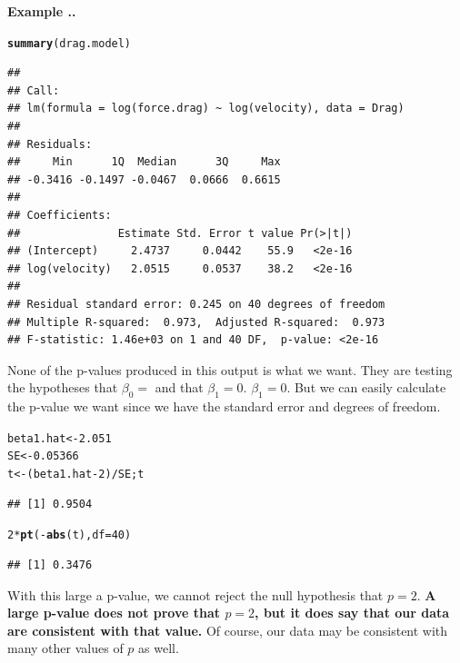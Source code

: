 \documentclass[twoside]{book}\usepackage[]{graphicx}\usepackage[]{xcolor}
\makeatletter
\newcommand{\hlnum}[1]{\textcolor[rgb]{0.686,0.059,0.569}{#1}}%
\newcommand{\hlopt}[1]{\textcolor[rgb]{0,0,0}{#1}}%
\newcommand{\hlstd}[1]{\textcolor[rgb]{0.345,0.345,0.345}{#1}}%
\newcommand{\hlkwb}[1]{\textcolor[rgb]{0.69,0.353,0.396}{#1}}%
\newcommand{\hlkwc}[1]{\textcolor[rgb]{0.333,0.667,0.333}{#1}}%
\newcommand{\hlkwd}[1]{\textcolor[rgb]{0.737,0.353,0.396}{\textbf{#1}}}%
\newenvironment{kframe}{%
 \def\at@end@of@kframe{}%
 \ifinner\ifhmode%
  \def\at@end@of@kframe{\end{minipage}}%
  \begin{minipage}{\columnwidth}%
 \fi\fi%
 \def\FrameCommand##1{\hskip\@totalleftmargin \hskip-\fboxsep
 \colorbox{shadecolor}{##1}\hskip-\fboxsep
     \hskip-\linewidth \hskip-\@totalleftmargin \hskip\columnwidth}%
 \MakeFramed {\advance\hsize-\width
   \@totalleftmargin\z@ \linewidth\hsize
   \@setminipage}}%
 {\par\unskip\endMakeFramed%
 \at@end@of@kframe}
\newenvironment{knitrout}{}{} %
\newcounter{example}[section]
\newenvironment{example}%
{\refstepcounter{example}%
\textbf{Example \thesection.\arabic{example}. }}%
{}
\makeatother
\begin{document}
\begin{example}
\begin{knitrout}
{}



\end{knitrout}

\begin{knitrout}
\color{fgcolor}\begin{kframe}
\begin{alltt}
\hlkwd{summary}\hlstd{(drag.model)}
\end{alltt}
\begin{verbatim}
## 
## Call:
## lm(formula = log(force.drag) ~ log(velocity), data = Drag)
## 
## Residuals:
##     Min      1Q  Median      3Q     Max 
## -0.3416 -0.1497 -0.0467  0.0666  0.6615 
## 
## Coefficients:
##               Estimate Std. Error t value Pr(>|t|)
## (Intercept)     2.4737     0.0442    55.9   <2e-16
## log(velocity)   2.0515     0.0537    38.2   <2e-16
## 
## Residual standard error: 0.245 on 40 degrees of freedom
## Multiple R-squared:  0.973,	Adjusted R-squared:  0.973 
## F-statistic: 1.46e+03 on 1 and 40 DF,  p-value: <2e-16
\end{verbatim}
\end{kframe}
\end{knitrout}
None of the p-values produced in this output is what we want.  
They are testing the hypotheses that $\beta_0 = $ and that $\beta_1 = 0$.
$\beta_1 = 0$.  
But we can easily calculate the p-value we want since we have the standard error
and degrees of freedom.


\begin{knitrout}
\color{fgcolor}\begin{kframe}
\begin{alltt}
\hlstd{beta1.hat} \hlkwb{<-} \hlnum{2.051}
\hlstd{SE} \hlkwb{<-} \hlnum{0.05366}
\hlstd{t} \hlkwb{<-}  \hlstd{( beta1.hat} \hlopt{-} \hlnum{2} \hlstd{)} \hlopt{/} \hlstd{SE; t}
\end{alltt}
\begin{verbatim}
## [1] 0.9504
\end{verbatim}
\begin{alltt}
\hlnum{2} \hlopt{*} \hlkwd{pt}\hlstd{(} \hlopt{-} \hlkwd{abs}\hlstd{(t),} \hlkwc{df}\hlstd{=} \hlnum{40} \hlstd{)}
\end{alltt}
\begin{verbatim}
## [1] 0.3476
\end{verbatim}
\end{kframe}
\end{knitrout}
With this large a p-value, we cannot reject the null hypothesis that $p = 2$.
\textbf{A large p-value does not prove that $p = 2$, 
but it does say that our data are consistent with that value.}  
Of course, our data may be consistent with many other values of $p$ as well.
\end{example}
\end{document}
